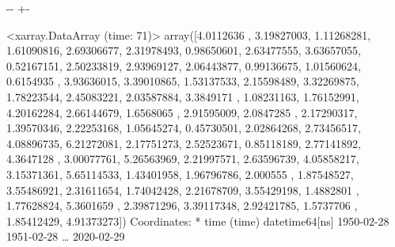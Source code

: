 \documentclass[letterpaper,10pt,english]{sphinxmanual}
\newlength\nbsphinxcodecellspacing
\begin{document}
{
\begin{sphinxVerbatim}[commandchars=\\\{\}]
\llap{\color{nbsphinxin}[54]:\,\hspace{\fboxrule}\hspace{\fboxsep}}  \PYG{p}{[}\PYG{p}{]}
                    
                  \PYG{p}{[}\PYG{p}{]}
                  \PYG{p}{[} \PYG{p}{]}
\end{sphinxVerbatim}
}

{

\kern-\sphinxverbatimsmallskipamount\kern-\baselineskip
\kern+\FrameHeightAdjust\kern-\fboxrule
\vspace{\nbsphinxcodecellspacing}

\begin{sphinxVerbatim}[commandchars=\\\{\}]
\llap{\color{nbsphinxout}[54]:\,\hspace{\fboxrule}\hspace{\fboxsep}}<xarray.DataArray (time: 71)>
array([4.0112636 , 3.19827003, 1.11268281, 1.61090816, 2.69306677,
       2.31978493, 0.98650601, 2.63477555, 3.63657055, 0.52167151,
       2.50233819, 2.93969127, 2.06443877, 0.99136675, 1.01560624,
       0.6154935 , 3.93636015, 3.39010865, 1.53137533, 2.15598489,
       3.32269875, 1.78223544, 2.45083221, 2.03587884, 3.3849171 ,
       1.08231163, 1.76152991, 4.20162284, 2.66144679, 1.6568065 ,
       2.91595009, 2.0847285 , 2.17290317, 1.39570346, 2.22253168,
       1.05645274, 0.45730501, 2.02864268, 2.73456517, 4.08896735,
       6.21272081, 2.17751273, 2.52523671, 0.85118189, 2.77141892,
       4.3647128 , 3.00077761, 5.26563969, 2.21997571, 2.63596739,
       4.05858217, 3.15371361, 5.65114533, 1.43401958, 1.96796786,
       2.000555  , 1.87548527, 3.55486921, 2.31611654, 1.74042428,
       2.21678709, 3.55429198, 1.4882801 , 1.77628824, 5.3601659 ,
       2.39871296, 3.39117348, 2.92421785, 1.5737706 , 1.85412429,
       4.91373273])
Coordinates:
  * time     (time) datetime64[ns] 1950-02-28 1951-02-28 {\ldots} 2020-02-29
\end{sphinxVerbatim}
}
\end{document}
